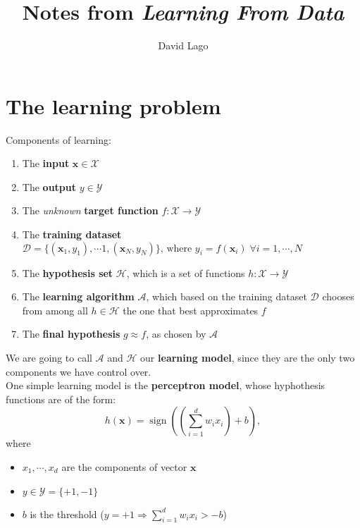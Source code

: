 \documentclass[11pt]{article}
\begin{document}
\title{Notes from \emph{Learning From Data}}
\author{David Lago}
\maketitle



\section {The learning problem}
Components of learning:
\begin{enumerate}
\item The \textbf{input} $\mathbf{x} \in \mathcal{X}$
\item The \textbf{output} $y \in \mathcal{Y}$
\item The \emph{unknown} \textbf{target function} $f\colon\mathcal{X}\longrightarrow\mathcal{Y}$
\item The \textbf{training dataset} $\mathcal{D}=\{(\mathbf{x}_1,y_1),\dotsb1,(\mathbf{x}_N,y_N)\}\text{, where }y_i=f(\mathbf{x}_i)\;\forall i=1,\dotsb,N$
\item The \textbf{hypothesis set} $\mathcal{H}$, which is a set of functions $h\colon\mathcal{X}\longrightarrow\mathcal{Y}$
\item The \textbf{learning algorithm} $\mathcal{A}$, which based on the training dataset $\mathcal{D}$ chooses from among all $h\in\mathcal{H}$ the one that best approximates $f$
\item The \textbf{final hypothesis} $g\approx f$, as chosen by $\mathcal{A}$
\end{enumerate}

We are going to call $\mathcal{A}$ and $\mathcal{H}$ our \textbf{learning model}, since they are the only two components we have control over.\\

One simple learning model is the \textbf{perceptron model}, whose hyphothesis functions are of the form:
\begin{equation}
h(\mathbf{x})=\operatorname{sign}((\sum_{i=1}^{d}w_ix_i)+b),
\label{perceptron_model}
\end{equation}
where

\begin{itemize}
  \item $x_1,\dotsb,x_d$ are the components of vector $\mathbf{x}$
  \item $y\in\mathcal{Y}=\{+1,-1\}$
  \item $b$ is the threshold ($y=+1\Rightarrow\sum_{i=1}^dw_ix_i>-b$)
\end{itemize}
\end{document}
